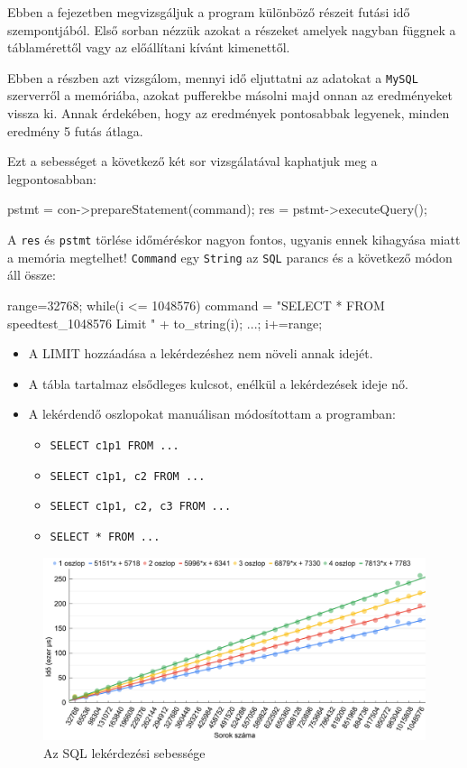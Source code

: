 
Ebben a fejezetben megvizsgáljuk a program különböző részeit futási idő szempontjából. Első sorban nézzük azokat a részeket amelyek nagyban függnek a táblamérettől vagy az előállítani kívánt kimenettől.  


Ebben a részben azt vizsgálom, mennyi idő eljuttatni az adatokat a \texttt{MySQL} szerverről a memóriába, azokat pufferekbe másolni majd onnan az eredményeket vissza ki.
Annak érdekében, hogy az eredmények pontosabbak legyenek, minden eredmény 5 futás átlaga.


Ezt a sebességet a következő két sor vizsgálatával kaphatjuk meg a legpontosabban:
\begin{python}
pstmt = con->prepareStatement(command);
res = pstmt->executeQuery();
\end{python}
A  \texttt{res} és \texttt{pstmt} törlése időméréskor nagyon fontos, ugyanis ennek kihagyása miatt a memória megtelhet!
\texttt{Command} egy \texttt{String} az \texttt{SQL} parancs és a következő módon áll össze:
\begin{python}
range=32768;
while(i <= 1048576){
   command = "SELECT * FROM speedtest_1048576 Limit "  + to_string(i);
   ...; i+=range; }
\end{python}
\begin{itemize}
\item A LIMIT hozzáadása a lekérdezéshez nem növeli annak idejét.
\item A tábla tartalmaz elsődleges kulcsot, enélkül a lekérdezések ideje nő.
\item A lekérdendő oszlopokat manuálisan módosítottam a programban: 
\begin{itemize} 
\item \texttt{SELECT c1p1 FROM ...}
\item \texttt{SELECT c1p1, c2 FROM ...} 
\item \texttt{SELECT c1p1, c2, c3 FROM ...} 
\item \texttt{SELECT * FROM ...} 
\end{itemize}
\end{itemize}
\begin{figure}[h!]
\centering
\includegraphics[width=\textwidth]{images/graph/sqlquery.png}
\caption{Az SQL lekérdezési sebessége}
\label{fig:schema}
\end{figure}
